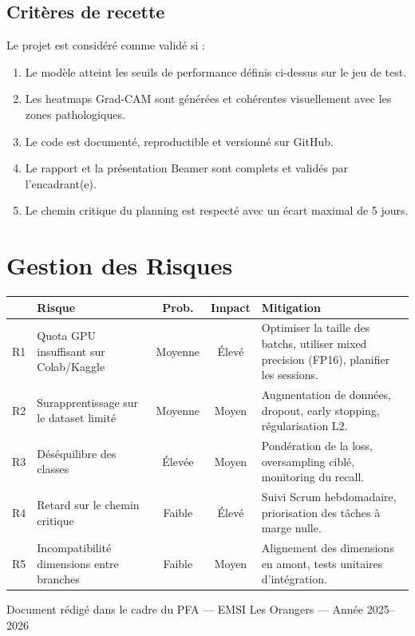 \documentclass[a4paper,12pt]{article}
\begin{document}
\subsection{Critères de recette}

Le projet est considéré comme validé si :

\begin{enumerate}[leftmargin=1.5em, itemsep=4pt]
  \item Le modèle atteint les seuils de performance définis ci-dessus sur le jeu de test.
  \item Les heatmaps Grad-CAM sont générées et cohérentes visuellement avec les zones pathologiques.
  \item Le code est documenté, reproductible et versionné sur GitHub.
  \item Le rapport et la présentation Beamer sont complets et validés par l'encadrant(e).
  \item Le chemin critique du planning est respecté avec un écart maximal de 5 jours.
\end{enumerate}

\section{Gestion des Risques}

\renewcommand{\arraystretch}{1.4}
\begin{tabularx}{\linewidth}{@{}c X c c X@{}}
  \toprule
  & \textbf{Risque} & \textbf{Prob.} & \textbf{Impact} & \textbf{Mitigation} \\
  \midrule
  R1 & Quota GPU insuffisant sur Colab/Kaggle &
    Moyenne & Élevé &
    Optimiser la taille des batchs, utiliser mixed precision (FP16), planifier les sessions. \\
  \rowcolor{grisClair}
  R2 & Surapprentissage sur le dataset limité &
    Moyenne & Moyen &
    Augmentation de données, dropout, early stopping, régularisation L2. \\
  R3 & Déséquilibre des classes &
    Élevée & Moyen &
    Pondération de la loss, oversampling ciblé, monitoring du recall. \\
  \rowcolor{grisClair}
  R4 & Retard sur le chemin critique &
    Faible & Élevé &
    Suivi Scrum hebdomadaire, priorisation des tâches à marge nulle. \\
  R5 & Incompatibilité dimensions entre branches &
    Faible & Moyen &
    Alignement des dimensions en amont, tests unitaires d'intégration. \\
  \bottomrule
\end{tabularx}


\vspace{1cm}
\begin{center}
  {\small\color{grisMoyen}%
    Document rédigé dans le cadre du PFA — EMSI Les Orangers — Année 2025–2026}
\end{center}
\end{document}

